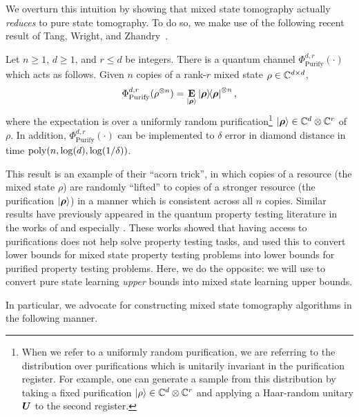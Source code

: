 \documentclass{article}
\newcommand{\purifychan}{\Phi_{\mathrm{Purify}}}
\begin{document}
We overturn this intuition by showing that mixed state tomography actually \emph{reduces} to pure state tomography.
To do so, we make use of the following recent result of Tang, Wright, and Zhandry~\cite{TWZ25}.
\begin{theorem}\label{thm:acorn}
    Let $n\geq 1$, $d \geq 1$, and $r \leq d$ be integers. 
    There is a quantum channel $\purifychan^{d, r}(\cdot)$ which acts as follows.
    Given $n$ copies of a rank-$r$ mixed state $\rho \in \mathbb C^{d \times d}$,
    \begin{equation*}
        \purifychan^{d, r}(\rho^{\otimes n}) = \E_{\ket{\brho}} \ketbra{\brho}^{\otimes n},
    \end{equation*}
    where the expectation is over a uniformly random purification\footnote{
        When we refer to a uniformly random purification, we are referring to the distribution over purifications which is unitarily invariant in the purification register.
        For example, one can generate a sample from this distribution by taking a fixed purification $\ket{\rho} \in \mathbb C^d \otimes \mathbb C^r$ and applying a Haar-random unitary $\boldsymbol{U}$ to the second register.
    } $\ket{\boldsymbol{\rho}} \in \mathbb C^d \otimes \mathbb C^r$ of $\rho$.
    In addition, $\purifychan^{d,r}(\cdot)$ can be implemented to $\delta$ error in diamond distance in time $\operatorname{poly}(n, \log(d), \log(1/\delta))$.
\end{theorem}
\noindent
This result is an example of their ``acorn trick'',
in which copies of a resource (the mixed state $\rho$)
are randomly ``lifted'' to copies of a stronger resource (the purification $\ket{\boldsymbol{\rho}}$)
in a manner which is consistent across all $n$ copies.
Similar results have previously appeared in the quantum property testing literature in the works of \cite[Theorem 35]{SW22} and especially \cite{CWZ24}. These works showed that having access to purifications does not help solve property testing tasks, and used this to convert lower bounds for mixed state property testing problems into lower bounds for purified property testing problems. 
Here, we do the opposite: we will use  to convert pure state learning \emph{upper} bounds into mixed state learning upper bounds.

In particular, we advocate for constructing mixed state tomography algorithms in the following manner.
\end{document}
